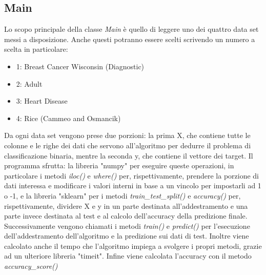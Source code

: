 \documentclass{article}
\begin{document}
    \subsection{Main}
	Lo scopo principale della classe \textit{Main} è quello di leggere uno dei quattro data set messi a disposizione. Anche questi potranno essere scelti scrivendo un numero a scelta in particolare:
	\begin{itemize}
		\item 1: Breast Cancer Wisconsin (Diagnostic)
		\item 2: Adult
		\item 3: Heart Disease
		\item 4: Rice (Cammeo and Osmancik)
	\end{itemize}
	Da ogni data set vengono prese due porzioni: la prima X, che contiene tutte le colonne e le righe dei dati che servono all'algoritmo per dedurre il problema di classificazione binaria, mentre la seconda y, che contiene il vettore dei target. Il programma sfrutta: la libreria "numpy" per eseguire queste operazioni, in particolare i metodi \textit{iloc()} e \textit{where()} per, rispettivamente, prendere la porzione di dati interessa e modificare i valori interni in base a un vincolo per impostarli ad 1 o -1, e la libreria "sklearn" per i metodi \textit{train\_test\_split()} e \textit{accuracy()} per, rispettivamente, dividere X e y in un parte destinata all'addestramento e una parte invece destinata al test e al calcolo dell'accuracy della predizione finale.
	Successivamente vengono chiamati i metodi \textit{train()} e \textit{predict()} per l'esecuzione dell'addestramento dell'algoritmo e la predizione sui dati di test. Inoltre viene calcolato anche il tempo che l'algoritmo impiega a svolgere i propri metodi, grazie ad un ulteriore libreria "timeit". Infine viene calcolata l'accuracy con il metodo \textit{accuracy\_score()}
\end{document}
